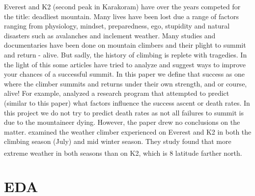 \documentclass[stu,12pt,floatsintext]{apa7}
\begin{document}
Everest and K2 (second peak in Karakoram) have over the years competed for the title: deadliest mountain. Many lives have been lost due a range of factors ranging from physiology, mindset, preparedness, ego, stupidity and natural disasters such as avalanches and inclement weather. Many studies and documentaries have been done on mountain climbers and their plight to summit and return - alive. But sadly, the history of climbing is replete with tragedies. In the light of this some articles have tried to analyze and suggest ways to improve your chances of a successful summit. In this paper we define that success as one where the climber summits and returns under their own strength, and or course, alive! For example, \textcite{huey_mountaineering_2001} analyzed a research program that attempted to predict (similar to this paper) what factors influence the success ascent or death rates. In this project we do not try to predict death rates as not all failures to summit is due to the mountaineer dying. However, the paper drew no conclusions on the matter. \textcite{szymczak_comparison_2021} examined the weather climber experienced on Everest and K2 in both the climbing season (July) and mid winter season. They study found that more extreme weather in both seasons than on K2, which is \si{8^{\circ}} latitude farther north.           


\section{EDA}
\end{document}
